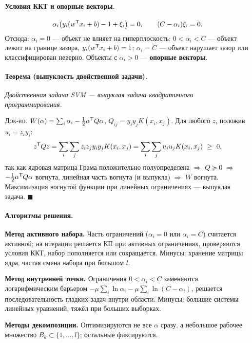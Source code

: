 \paragraph{Условия ККТ и опорные векторы.}
\[
  \alpha_i\big(y_i(w^{\mathsf{T}} x_i + b) - 1 + \xi_i\big) = 0 ,
  \qquad (C - \alpha_i)\xi_i = 0 .
\]
Отсюда: $\alpha_i = 0$ — объект не влияет на гиперплоскость;
$0 < \alpha_i < C$ — объект лежит на границе зазора,
$y_i(w^{\mathsf{T}} x_i + b) = 1$; $\alpha_i = C$ — объект нарушает зазор или
классифицирован неверно. Объекты с $\alpha_i > 0$ — \textbf{опорные векторы}.

\paragraph{Теорема (выпуклость двойственной задачи).}
\textit{Двойственная задача SVM — выпуклая задача квадратичного
программирования.}

\textsc{Док-во.} $W(\alpha) = \sum_i\alpha_i - \tfrac12\alpha^{\mathsf{T}} Q\alpha$,
$Q_{ij} = y_iy_jK(x_i,x_j)$. Для любого $z$, положив $u_i = z_iy_i$:
\[
  z^{\mathsf{T}} Q z = \sum_i\sum_j z_iz_jy_iy_jK(x_i,x_j)
          = \sum_i\sum_j u_iu_jK(x_i,x_j) \ \ge\ 0 ,
\]
так как ядровая матрица Грама положительно полуопределена $\Rightarrow$
$Q \succeq 0$ $\Rightarrow$ $-\tfrac12\alpha^{\mathsf{T}} Q\alpha$ вогнута, линейная
часть вогнута (и выпукла) $\Rightarrow$ $W$ вогнута. Максимизация вогнутой
функции при линейных ограничениях — выпуклая задача. $\blacksquare$

\paragraph{Алгоритмы решения.}
\begin{csteps}
  \item \textbf{Метод активного набора.} Часть ограничений ($\alpha_i = 0$ или
        $\alpha_i = C$) считается активной; на итерации решается КП при
        активных ограничениях, проверяются условия ККТ, набор пополняется или
        сокращается. Минусы: хранение матрицы ядра, частая смена набора при
        большом $l$.
  \item \textbf{Метод внутренней точки.} Ограничения $0 < \alpha_i < C$
        заменяются логарифмическим барьером
        $-\mu\sum_i\ln\alpha_i - \mu\sum_i\ln(C - \alpha_i)$, решается
        последовательность гладких задач внутри области. Минусы: большие
        системы линейных уравнений, тяжёл при больших выборках.
  \item \textbf{Методы декомпозиции.} Оптимизируются не все $\alpha$ сразу, а
        небольшое рабочее множество $B_k \subset \{1,\dots,l\}$; остальные
        фиксируются.
\end{csteps}

